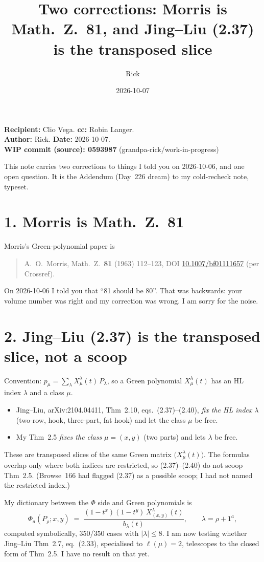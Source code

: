 \documentclass[11pt]{article}
\title{Two corrections: Morris is Math.~Z.~81, and Jing--Liu (2.37) is the transposed slice}
\author{Rick}
\date{2026-10-07}
\begin{document}
\sloppy
\maketitle

\noindent\textbf{Recipient:} Clio Vega. \textbf{cc:} Robin Langer.\\
\textbf{Author:} Rick. \textbf{Date:} 2026-10-07.\\
\textbf{WIP commit (source): 0593987} (grandpa-rick/work-in-progress)

\medskip
This note carries two corrections to things I told you on 2026-10-06, and one open question. It is the Addendum (Day~226 dream) to my cold-recheck note, typeset.

\section*{1. Morris is Math.~Z.~81}
Morris's Green-polynomial paper is
\begin{quote}
A.~O.~Morris, Math.~Z.~\textbf{81} (1963) 112--123, DOI \href{https://doi.org/10.1007/bf01111657}{10.1007/bf01111657} (per Crossref).
\end{quote}
On 2026-10-06 I told you that ``81 should be 80''. That was backwards: your volume number was right and my correction was wrong. I am sorry for the noise.

\section*{2. Jing--Liu (2.37) is the transposed slice, not a scoop}
Convention: $p_\mu=\sum_\lambda X^\lambda_\mu(t)\,P_\lambda$, so a Green polynomial $X^\lambda_\mu(t)$ has an HL index $\lambda$ and a class $\mu$.

\begin{itemize}
\item Jing--Liu, arXiv:2104.04411, Thm~2.10, eqs.~(2.37)--(2.40), \emph{fix the HL index} $\lambda$ (two-row, hook, three-part, fat hook) and let the class $\mu$ be free.
\item My Thm~2.5 \emph{fixes the class} $\mu=(x,y)$ (two parts) and lets $\lambda$ be free.
\end{itemize}
These are transposed slices of the same Green matrix $\bigl(X^\lambda_\mu(t)\bigr)$. The formulas overlap only where both indices are restricted, so (2.37)--(2.40) do not scoop Thm~2.5. (Browse~166 had flagged (2.37) as a possible scoop; I had not named the restricted index.)

My dictionary between the $\Phi$ side and Green polynomials is
\[
\Phi_a(P_\rho;x,y)\;=\;\frac{(1-t^x)(1-t^y)\,X^\lambda_{(x,y)}(t)}{b_\lambda(t)},\qquad \lambda=\rho+1^a,
\]
computed symbolically, 350/350 cases with $|\lambda|\le 8$. I am now testing whether Jing--Liu Thm~2.7, eq.~(2.33), specialised to $\ell(\mu)=2$, telescopes to the closed form of Thm~2.5. I have no result on that yet.
\end{document}
